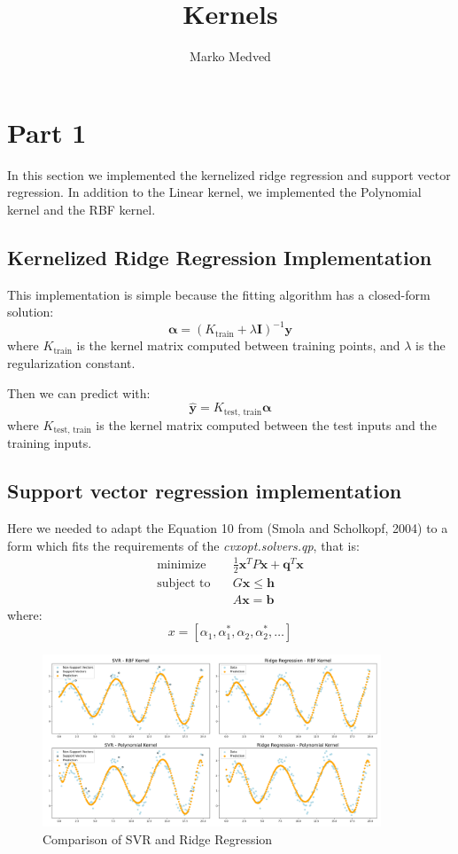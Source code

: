 \documentclass[9pt]{IEEEtran}
\title{\vspace{0ex}
Kernels}
\author{Marko Medved\vspace{-4.0ex}}
\begin{document}
\maketitle


\section{Part 1}

In this section we implemented the kernelized ridge regression and support vector
regression. In addition to the Linear kernel, we implemented the Polynomial kernel 
and the RBF kernel.

\subsection{Kernelized Ridge Regression Implementation}

This implementation is simple because the fitting algorithm has a closed-form solution:
\[
\boldsymbol{\alpha} = (K_{\text{train}} + \lambda \mathbf{I})^{-1} \mathbf{y}
\]
where \( K_{\text{train}} \) is the kernel matrix computed between training points, and \( \lambda \) is the regularization constant.

Then we can predict with:
\[
\hat{\mathbf{y}} = K_{\text{test, train}} \boldsymbol{\alpha}
\]
where \( K_{\text{test, train}} \) is the kernel matrix computed between the test inputs and the training inputs.




\subsection{Support vector regression implementation}
Here we needed to adapt the Equation 10 from (Smola and Scholkopf, 2004) to a form
 which fits 
the requirements of the \textit{cvxopt.solvers.qp}, that is: 
\[
\begin{aligned}
\text{minimize} \quad & \frac{1}{2} \mathbf{x}^T P \mathbf{x} + \mathbf{q}^T \mathbf{x} \\
\text{subject to} \quad & G \mathbf{x} \leq \mathbf{h} \\
                        & A \mathbf{x} = \mathbf{b}
\end{aligned}
\]
where:
\[
x = \left[ \alpha_1, \alpha_1^*, \alpha_2, \alpha_2^*, \ldots \right]
\]

\begin{figure}[H]
    \centering
    \includegraphics[width=0.9\textwidth]{figures/part1.png}
    \caption{Comparison of SVR and Ridge Regression}
    \label{fig:part1}
\end{figure}
\end{document}
